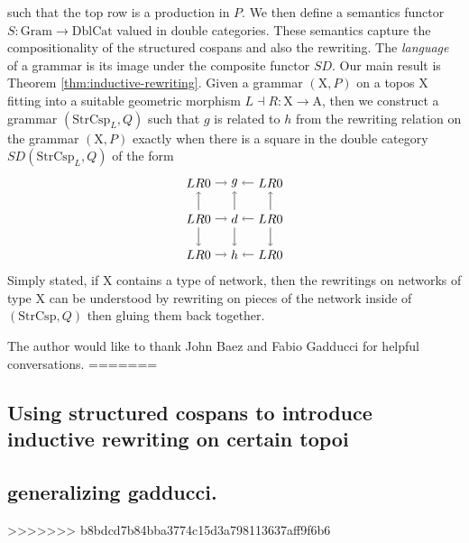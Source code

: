 \documentclass{amsart}
\newcommand{\A}{\cat{A}}
\newcommand{\X}{\cat{X}}
\newcommand{\DblCat}{\cat{DblCat}}
\newcommand{\Gram}{\cat{Gram}}
\newcommand{\StrCsp}{\cat{StrCsp}}
\newcommand{\Gram}{\cat{Gram}}
\newcommand{\cat}[1]{\mathrm{#1}}
\newcommand{\from}{\colon}
\theoremstyle{remark}
\theoremstyle{definition}
\begin{document}
% 
such that the top row is a production in $ P $. We then define a
semantics functor $ S \from \Gram \to \DblCat $ valued in double
categories.  These semantics capture the compositionality of the
structured cospans and also the rewriting.  The \emph{language} of a
grammar is its image under the composite functor $ SD $. Our main
result is Theorem \ref{thm:inductive-rewriting}. Given a grammar
$ ( \X , P ) $ on a topos $ \X $ fitting into a suitable geometric
morphism $ L \dashv R \from \X \to \A $, then we construct a grammar $
( \StrCsp_L , Q ) $ such that $ g $ is related to $ h $ from the
rewriting relation on the grammar $ ( \X , P ) $ exactly when there is
a square in the double category $ SD ( \StrCsp_L , Q ) $ of the form
\[
    \begin{tikzpicture}
      \node (1t) at (0,2) {$ LR 0 $};
      \node (2t) at (1,2) {$ g $};
      \node (3t) at (2,2) {$ LR 0 $};
      \node (1m) at (0,1) {$ LR 0 $};
      \node (2m) at (1,1) {$ d $};
      \node (3m) at (2,1) {$ LR 0 $};
      \node (1b) at (0,0) {$ LR 0 $};
      \node (2b) at (1,0) {$ h $};
      \node (3b) at (2,0) {$ LR 0 $};
      \draw [->] (1t) to node [] {\scriptsize{$  $}} (2t);
      \draw [->] (3t) to node [] {\scriptsize{$  $}} (2t);
      \draw [->] (1m) to node [] {\scriptsize{$  $}} (2m);
      \draw [->] (3m) to node [] {\scriptsize{$  $}} (2m);
      \draw [->] (1b) to node [] {\scriptsize{$  $}} (2b);
      \draw [->] (3b) to node [] {\scriptsize{$  $}} (2b);
      \draw [->] (1m) to node [] {\scriptsize{$  $}} (1t);
      \draw [->] (1m) to node [] {\scriptsize{$  $}} (1b);
      \draw [->] (2m) to node [] {\scriptsize{$  $}} (2t);
      \draw [->] (2m) to node [] {\scriptsize{$  $}} (2b);
      \draw [->] (3m) to node [] {\scriptsize{$  $}} (3t);
      \draw [->] (3m) to node [] {\scriptsize{$  $}} (3b);
    \end{tikzpicture}
\]
Simply stated, if $ \X $ contains a type of network, then the
rewritings on networks of type $ \X $ can be understood by rewriting
on pieces of the network inside of $ ( \StrCsp , Q ) $ then gluing
them back together.

The author would like to thank John Baez and Fabio Gadducci for
helpful conversations.
=======
\label{sec-1}
\subsection{Using structured cospans to introduce inductive rewriting on certain topoi}
\label{sec-1-1}
\subsection{generalizing gadducci.}
\label{sec-1-2}
>>>>>>> b8bdcd7b84bba3774c15d3a798113637aff9f6b6
\end{document}
